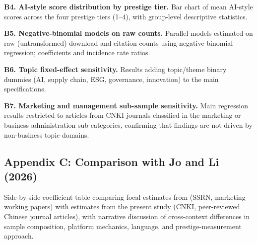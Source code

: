 \documentclass[12pt,a4paper]{article}
\begin{document}
\textbf{B4. AI-style score distribution by prestige tier.}
Bar chart of mean AI-style scores across the four prestige tiers (1--4),
with group-level descriptive statistics.

\textbf{B5. Negative-binomial models on raw counts.}
Parallel models estimated on raw (untransformed) download and citation
counts using negative-binomial regression; coefficients and incidence
rate ratios.

\textbf{B6. Topic fixed-effect sensitivity.}
Results adding topic/theme binary dummies (AI, supply chain, ESG,
governance, innovation) to the main specifications.

\textbf{B7. Marketing and management sub-sample sensitivity.}
Main regression results restricted to articles from CNKI journals
classified in the marketing or business administration sub-categories,
confirming that findings are not driven by non-business topic domains.

\subsection*{Appendix C: Comparison with Jo and Li (2026)}

Side-by-side coefficient table comparing focal estimates from
\citet{JoLi2026} (SSRN, marketing working papers) with estimates from
the present study (CNKI, peer-reviewed Chinese journal articles),
with narrative discussion of cross-context differences in sample
composition, platform mechanics, language, and prestige-measurement
approach.
\end{document}

